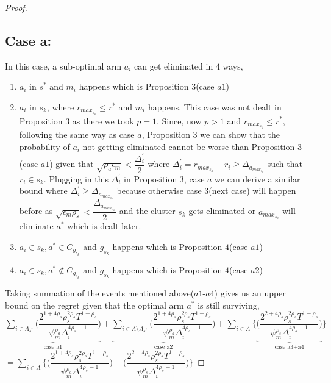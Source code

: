 \begin{proof}
\subsection{Case a:} 
In this case, a sub-optimal arm $a_{i}$ can get eliminated in $4$ ways,
\begin{enumerate}
\item $a_{i}$ in $s^{*}$ and $m_{i}$ happens which is Proposition $3$(case $a1$)
\item $a_{i}$ in $s_{k}$, where $r_{max_{s_{k}}}\leq r^{*}$ and $m_{i}$ happens. This case was not dealt in Proposition $3$ as there we took $p=1$. Since, now $p>1$ and $r_{max_{s_{k}}}\leq r^{*}$, following the same way as case $a$, Proposition $3$ we can show that the probability of $a_{i}$ not getting eliminated  cannot be worse than Proposition $3$(case $a1$) given that $\sqrt{\rho_{a}\epsilon_{m}}< \dfrac{\Delta^{'}_{i}}{2}$ where $\Delta^{'}_{i}=r_{max_{s_{k}}} - r_{i}\geq\Delta_{a_{max_{s_{k}}}}$ such that $r_{i}\in s_{k}$. Plugging in this $\Delta^{'}_{i}$ in Proposition $3$, case $a$ we can derive a similar bound where $\Delta^{'}_{i}\geq \Delta_{a_{max_{s_{k}}}}$ because otherwise case $3$(next case) will happen before as $\sqrt{\epsilon_{m}\rho_{s}}< \dfrac{\Delta_{a_{max_{s_{k}}}}}{2}$ and the cluster $s_{k}$ gets eliminated or $a_{max_{s_{k}}}$ will eliminate $a^{*}$ which is dealt later.
\item $a_{i}\in s_{k}, a^{*}\in C_{g_{s_{k}}}$ and $g_{s_{k}}$ happens which is Proposition $4$(case $a1$)
\item $a_{i}\in s_{k}, a^{*}\notin C_{g_{s_{k}}}$ and $g_{s_{k}}$ happens which is Proposition $4$(case $a2$)
\end{enumerate}
Taking summation of the events mentioned above($a1$-$a4$) gives us an upper bound on the regret given that the optimal arm $a^{*}$ is still surviving, 
\newline
$ \underbrace{\sum_{i\in A_{s^{*}}}\bigg(\dfrac{2^{1+4\rho_{s}}\rho_{s}^{2\rho_{s}}T^{1-\rho_{s}}}{\psi_{m}^{\rho_{a}}\Delta_{i}^{4\rho_{s}-1}}\bigg)}_{\text{case a1}} + \underbrace{\sum_{i\in A\setminus A_{s^{*}}}\bigg(\dfrac{2^{1+4\rho_{s}}\rho_{s}^{2\rho_{s}}T^{1-\rho_{s}}}{\psi_{m}^{\rho_{a}}\Delta_{i}^{4\rho_{s}-1}}\bigg)}_{\text{case a2}} + \sum_{i\in A}\bigg\lbrace \underbrace{\bigg(\dfrac{2^{2+4\rho_{s}}\rho_{s}^{2\rho_{s}}T^{1-\rho_{s}}}{\psi_{m}^{\rho_{s}}\Delta_{i}^{4\rho_{s}-1}}\bigg)}_{\text{case a3+a4}}\bigg\rbrace $ 
\newline
$= \sum_{i\in A}\bigg\lbrace \bigg(\dfrac{2^{1+4\rho_{s}}\rho_{s}^{2\rho_{s}}T^{1-\rho_{s}}}{\psi_{m}^{\rho_{a}}\Delta_{i}^{4\rho_{s}-1}}\bigg) + \bigg(\dfrac{2^{2+4\rho_{s}}\rho_{s}^{2\rho_{s}}T^{1-\rho_{s}}}{\psi_{m}^{\rho_{s}}\Delta_{i}^{4\rho_{s}-1}}\bigg)\bigg\rbrace$

\end{proof}
